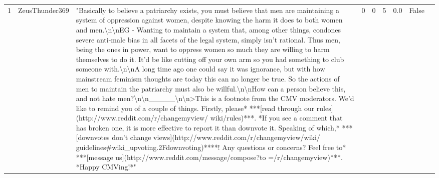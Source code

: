 \documentclass[a4paper]{article}
\begin{document}
\begin{table}
\begin{tabularx}{\textwidth}{@{}llLllllll@{}}
        1  & ZeusThunder369 & "Basically to believe a patriarchy exists, you must believe that men are maintaining a system of oppression against women, despite knowing the harm it does to both women and men.\textbackslash{}n\textbackslash{}nEG - Wanting to maintain a system that, among other things, condones severe anti-male bias in all facets of the legal system, simply isn't rational. Thus men, being the ones in power, want to oppress women so much they are willing to harm themselves to do it. It'd be like cutting off your own arm so you had something to club someone with.\textbackslash{}n\textbackslash{}nA long time ago one could say it was ignorance, but with how mainstream feminism thoughts are today this can no longer be true. So the actions of men to maintain the patriarchy must also be willful.\textbackslash{}n\textbackslash{}nHow can a person believe this, and not hate men?\textbackslash{}n\textbackslash{}n\_\_\_\_\_\textbackslash{}n\textbackslash{}n\textgreater *This is a footnote from the CMV moderators. We'd like to remind you of a couple of things. Firstly, please* ***{[}read through our rules{]}(http://www.reddit.com/r/changemyview/ wiki/rules)***. *If you see a comment that has broken one, it is more effective to report it than downvote it. Speaking of which,* ***{[}downvotes don't change views{]}(http://www.reddit.com/r/changemyview/wiki/ guidelines\#wiki\_upvoting.2Fdownvoting)****! Any questions or concerns? Feel free to* ***{[}message us{]}(http://www.reddit.com/message/compose?to =/r/changemyview)***. *Happy CMVing!*" & 0        & 0     & 5   & 0.0            & False       \\

\end{tabularx}
\end{table}
\end{document}
